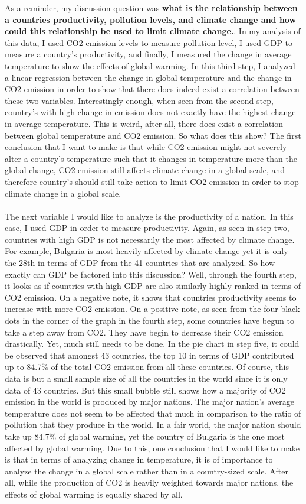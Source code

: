 \documentclass[fontsize=11pt]{article}
\begin{document}
As a reminder, my discussion question was \textbf{what is the relationship between a countries productivity, pollution levels, and climate change and how could this relationship be used to limit climate change.}. In my analysis of this data, I used CO2 emission levels to measure pollution level, I used GDP to measure a country's productivity, and finally, I measured the change in average temperature to show the effects of global warming. In this third step, I analyzed a linear regression between the change in global temperature and the change in CO2 emission in order to show that there does indeed exist a correlation between these two variables. Interestingly enough, when seen from the second step, country's with high change in emission does not exactly have the highest change in average temperature. This is weird, after all, there does exist a correlation between global temperature and CO2 emission. So what does this show? The first conclusion that I want to make is that while CO2 emission might not severely alter a country's temperature such that it changes in temperature more than the global change, CO2 emission still affects climate change in a global scale, and therefore country's should still take action to limit CO2 emission in order to stop climate change in a global scale.
\\\\ The next variable I would like to analyze is the productivity of a nation. In this case, I used GDP in order to measure productivity. Again, as seen in step two, countries with high GDP is not necessarily the most affected by climate change. For example, Bulgaria is most heavily affected by climate change yet it is only the 28th in terms of GDP from the 41 countries that are analyzed. So how exactly can GDP be factored into this discussion? Well, through the fourth step, it looks as if countries with high GDP are also similarly highly ranked in terms of CO2 emission. On a negative note, it shows that countries productivity seems to increase with more CO2 emission. On a positive note, as seen from the four black dots in the corner of the graph in the fourth step, some countries have begun to take a step away from CO2. They have begin to decrease their CO2 emission drastically. Yet, much still needs to be done. In the pie chart in step five, it could be observed that amongst 43 countries, the top 10 in terms of GDP contributed up to 84.7\% of the total CO2 emission from all these countries. Of course, this data is but a small sample size of all the countries in the world since it is only data of 43 countries. But this small bubble still shows how a majority of CO2 emission in the world is produced by major nations. The major nation's average temperature does not seem to be affected that much in comparison to the ratio of pollution that they produce in the world. In a fair world, the major nation should take up 84.7\% of global warming, yet the country of Bulgaria is the one most affected by global warming. Due to this, one conclusion that I would like to make is that in terms of analyzing change in temperature, it is of importance to analyze the change in a global scale rather than in a country-sized scale. After all, while the production of CO2 is heavily weighted towards major nations, the effects of global warming is equally shared by all.
\end{document}
